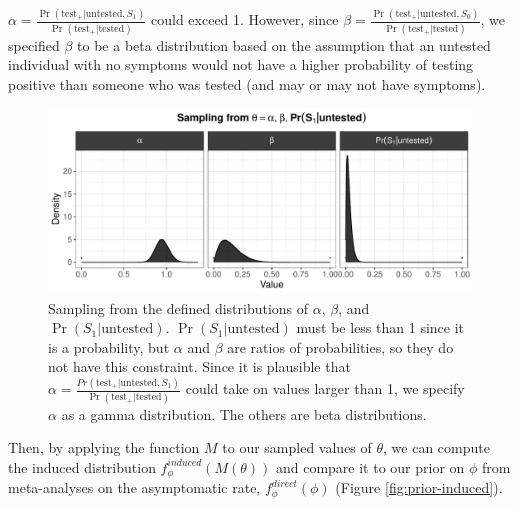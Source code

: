 \documentclass[12pt,twoside]{smiththesis}
\begin{document}
\(\alpha = \frac{\Pr(\text{test}_+|\text{untested}, S_1)}{\Pr(\text{test}_+|\text{tested})}\) could exceed 1. However, since \(\beta =\frac{\Pr(\text{test}_+|\text{untested}, S_0)}{\Pr(\text{test}_+|\text{tested})}\), we specified \(\beta\) to be a beta distribution based on the assumption that an untested individual with no symptoms would not have a higher probability of testing positive than someone who was tested (and may or may not have symptoms).
\begin{figure}

{\centering \includegraphics[width=1\linewidth]{figure/theta-samp-chap2} 

}

\caption{\label{fig:theta}Sampling from the defined distributions of $\alpha$, $\beta$, and $\Pr(S_1|\text{untested})$. $\Pr(S_1|\text{untested})$ must be less than 1 since it is a probability, but $\alpha$ and $\beta$ are ratios of probabilities, so they do not have this constraint. Since it is plausible that $\alpha = \frac{Pr(\text{test}_+|\text{untested}, S_1)}{\Pr(\text{test}_+|\text{tested})}$ could take on values larger than 1, we specify $\alpha$ as a gamma distribution. The others are beta distributions.}\label{fig:create-theta}
\end{figure}
Then, by applying the function \(M\) to our sampled values of \(\theta\), we can compute the induced distribution \(f_\phi^{induced}(M(\theta))\) and compare it to our prior on \(\phi\) from meta-analyses on the asymptomatic rate, \(f_\phi^{direct}(\phi)\) (Figure \ref{fig:prior-induced}).
\end{document}
